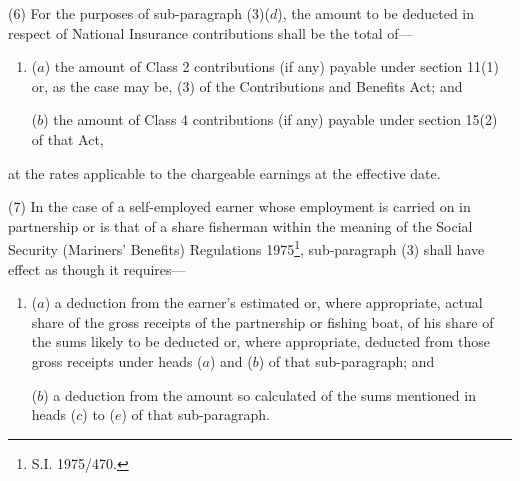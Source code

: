 \documentclass[12pt,a4paper]{article}
\begin{document}
(6) For the purposes of sub-paragraph (3)($d$), the amount to be deducted in respect of National Insurance contributions shall be the total of—
\begin{enumerate}\item[]
($a$) the amount of Class 2 contributions (if any) payable under section 11(1) or, as the case may be, 
(3)  %
of the Contributions and Benefits Act; and

($b$) the amount of Class 4 contributions (if any) payable under section 15(2) of that Act,
\end{enumerate}
at the rates applicable 
to the chargeable earnings %
at the effective date.

%

(7) In the case of a self-employed earner whose employment is carried on in partnership or is that of a share fisherman within the meaning of the Social Security (Mariners' Benefits) Regulations 1975\footnote{\frenchspacing S.I. 1975/470.}, sub-paragraph (3) shall have effect as though it requires—
\begin{enumerate}\item[]
($a$) a deduction from the earner’s estimated or, where appropriate, actual share of the gross receipts of the partnership or fishing boat, of his share of the sums likely to be deducted or, where appropriate, deducted from those gross receipts under heads ($a$) and ($b$) of that sub-paragraph; and

($b$) a deduction from the amount so calculated of the sums mentioned in heads ($c$) to ($e$) of that sub-paragraph.
\end{enumerate}
\end{document}
